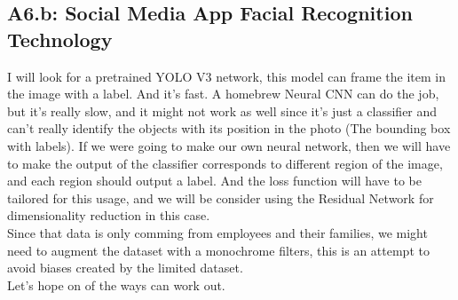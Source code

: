 \documentclass[]{article}
\begin{document}
    \subsection*{A6.b: Social Media App Facial Recognition Technology}
        I will look for a pretrained YOLO V3 network, this model can frame the item in the image with a label. And it's fast. A homebrew Neural CNN can do the job, but it's really slow, and it might not work as well since it's just a classifier and can't really identify the objects with its position in the photo (The bounding box with labels). If we were going to make our own neural network, then we will have to make the output of the classifier corresponds to different region of the image, and each region should output a label. And the loss function will have to be tailored for this usage, and we will be consider using the Residual Network for dimensionality reduction in this case.  
        \\[1.1em]
        Since that data is only comming from employees and their families, we might need to augment the dataset with a monochrome filters, this is an attempt to avoid biases created by the limited dataset. 
        \\[1.1em]
        Let's hope on of the ways can work out. 
\end{document}
